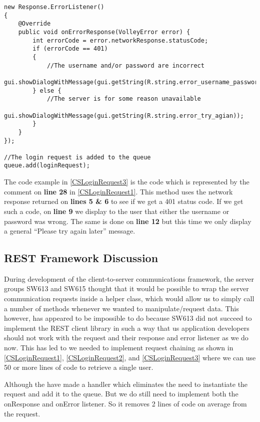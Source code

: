 \begin{minipage}[H]{\linewidth}
\begin{lstlisting}[caption = Using an errorListener to detect mishaps in the LoginRequest, label = CSLoginRequest3] 
new Response.ErrorListener() 
{
	@Override
    public void onErrorResponse(VolleyError error) {
        int errorCode = error.networkResponse.statusCode;
        if (errorCode == 401) 
        {
        	//The username and/or password are incorrect
            gui.showDialogWithMessage(gui.getString(R.string.error_username_password));
        } else {
            //The server is for some reason unavailable
            gui.showDialogWithMessage(gui.getString(R.string.error_try_agian));
        }
    }
});

//The login request is added to the queue
queue.add(loginRequest);
\end{lstlisting}
\end{minipage}

The code example in \autoref{CSLoginRequest3} is the code which is represented
by the comment on \textbf{line 28} in \autoref{CSLoginRequest1}.
This method uses the network response returned on \textbf{lines 5 \& 6} to see
if we get a 401 status code. If we get such a code, on \textbf{line 9} we
display to the user that either the username or password was wrong. The same is
done on \textbf{line 12} but this time we only display a general ``Please try
again later'' message.


\subsection{REST Framework Discussion}
During development of the client-to-server communications framework, the server
groups SW613 and SW615 thought that it would be possible to wrap the server
communication requests inside a helper class, which would allow us to simply
call a number of methods whenever we wanted to manipulate/request data. This
however, has appeared to be impossible to do because SW613 did not succeed to
implement the REST client library in such a way that us application developers
should not work with the request and their response and error listener as we do
now. This has led to we needed to implement request chaining as shown in \autoref{CSLoginRequest1},
\autoref{CSLoginRequest2}, and \autoref{CSLoginRequest3} where we can use 50 or
more lines of code to retrieve a single user.\nl

Although the have made a handler which eliminates the need to instantiate the
request and add it to the queue. But we do still need to implement both
the onResponse and onError listener. So it removes 2 lines of code on average from
the request.\nl

